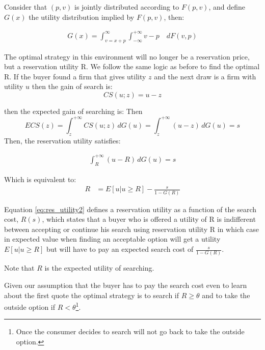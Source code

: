 \documentclass[12pt]{article}
\theoremstyle{plain}
\theoremstyle{plain}
\begin{document}
Consider that $(p,v)$ is jointly distributed according to $F(p,v)$, and define $G(x)$ the utility distribution implied by $F(p,v)$, then: 

\begin{align*}
    G(x) = \int_{v= x+p}^\infty \int_{-\infty}^{+\infty} v-p \quad dF(v,p) 
\end{align*}

The optimal strategy in this environment will no longer be a reservation price, but a reservation utility R. We follow the same logic as before to find the optimal R. If the buyer found a firm that gives utility $z$ and the next draw is a firm with utility $u$ then the gain of search is: 
\[
CS(u; z) = u - z
\]

then the expected gain of searching is: 
Then
\[
ECS(z) = \int_z^{+\infty} CS(u; z)\, dG(u)
= \int_z^{+\infty} (u - z)\, dG(u) = s
\]
Then, the reservation utility satisfies: 

\begin{align}\label{eq:res_utility}
    \int_R^{+\infty} (u - R)\, dG(u) = s    
\end{align}

Which is equivalent to: 
\begin{align}\label{eq:res_utility2}
    R &=E[u|u\geq R]- \frac{s}{1-G(R)} 
\end{align}

Equation \ref{eq:res_utility2} defines a reservation utility as a function of the search cost, $R(s)$, which states that a buyer who is offered a utility of R is indifferent between accepting or continue his search using reservation utility R in which case in expected value when finding an acceptable option will get a utility $E[u|u\geq R]$ but will have to pay an expected search cost of $\frac{s}{1-G(R)}$. 


Note that $R$ is the expected utility of searching. 

Given our assumption that the buyer has to pay the search cost even to learn about the first quote the optimal strategy is to search if  
$ R\geq \theta $ and to take the outside option if $R<\theta$\footnote{Once the consumer decides to search will not go back to take the outside option.}. 
\end{document}
